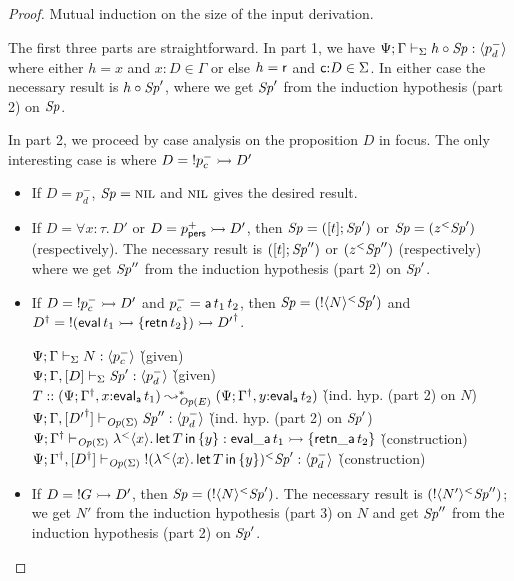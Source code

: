 \begin{proof}
Mutual induction on the size 
of the input derivation.

The first three parts are straightforward. In part 1, we have
${\Psi}; {\Gamma} \vdash_{\Sigma} {{h} \circ {{\it Sp}}} : {\langle {p^-_d} \rangle}$ where
either $h = x$ and $x{:}D \in \Gamma$ or else $h = {\sf r}$ and ${\sf
  c}{:}D \in \Sigma$. In either case the necessary result is
${h} \circ {{\it Sp}'}$, where we get ${\it Sp}'$ from the induction hypothesis
(part 2) on ${\it Sp}$.

In part 2, we proceed by case analysis on the proposition $D$ in focus. 
The only interesting case is where $D = {!}p^-_c \rightarrowtail D'$
\begin{itemize}
\item If $D = p_d^-$, ${\it Sp} = \textsc{nil}$ and $\textsc{nil}$ gives the desired result.

\item If $D = \forall x{:}\tau.\,D'$ or $D = p^+_{\sf
    pers} \rightarrowtail D'$, then ${\it Sp} = ([{t}]; {{\it Sp}'})$ 
  or ${\it Sp} = ({z}{^{<}}{{\it Sp}'})$ (respectively). The necessary result is
  $([{t}]; {{\it Sp}''})$ 
  or $({z}{^{<}}{{\it Sp}''})$ (respectively) where we get ${\it Sp}''$ from the
  induction hypothesis (part 2) on ${\it Sp}'$. 

\item If $D = {!}p^-_c \rightarrowtail D'$ and $p^-_c = {\sf a}\,t_1\,t_2$, then 
  ${\it Sp} = ({{!}{\langle {N} \rangle}}{^{<}}{{\it Sp}'})$
  and ${{D}^\dag} = {!}({\sf eval}\,t_1 \rightarrowtail \{ {\sf retn}\,t_2 \}) \rightarrowtail {{D'}^\dag}$.

  \begin{tabbing}
  ${\Psi}; {\Gamma} \vdash_{\Sigma} {N} : {\langle {p^-_c} \rangle}$
  \` (given)
  \\
  ${\Psi}; {\Gamma, [D]} \vdash_{\Sigma} {{\it Sp}'} : {\langle {p^-_d} \rangle}$
  \` (given)
  \\
  $T :: (\Psi; {{\Gamma}^\dag}, x{:}{\sf eval_a}\,t_1)
    \leadsto^*_{{\it Op}({E})} (\Psi; {{\Gamma}^\dag}, y{:}{\sf eval_a}\,t_2)$
  \` (ind. hyp. (part 2) on $N$)
  \\
  ${\Psi}; {\Gamma, [{{D'}^\dag}]} \vdash_{{\it Op}({\Sigma})} {{\it Sp}''} : {\langle {p_d^-} \rangle}$
  \` (ind. hyp. (part 2) on ${\it Sp}'$)
  \\
  ${\Psi}; {{{\Gamma}^\dag}} \vdash_{{\it Op}({\Sigma})} {{\lambda}^{<}{\langle {x} \rangle . {\,{\sf let}\,{T}\,{\sf in}\,\{ {y} \}}}} : {{\sf eval\_a}\,t_1 \rightarrowtail \{ {\sf retn\_a}\,t_2 \}}$
  \` (construction)
  \\
  ${\Psi}; {{{\Gamma}^\dag}, [{{D}^\dag}]} \vdash_{{\it Op}({\Sigma})} {{{!}{({\lambda}^{<}{\langle {x} \rangle . {\,{\sf let}\,{T}\,{\sf in}\,\{ {y} \}}})}}{^{<}}{{\it Sp}'}} : {\langle {p^-_d} \rangle}$
  \` (construction)
  \end{tabbing}
\item If $D = {!}G \rightarrowtail D'$, then ${\it Sp} =
  ({{!}{\langle {N} \rangle}}{^{<}}{{\it Sp}'})$. The necessary result is
  $({{!}{\langle {N'} \rangle}}{^{<}}{{\it Sp}''})$; we get $N'$ from the
  induction hypothesis (part 3) on $N$ and get ${\it Sp}''$ from the induction
  hypothesis (part 2) on ${\it Sp}'$.
\end{itemize}


\end{proof}
